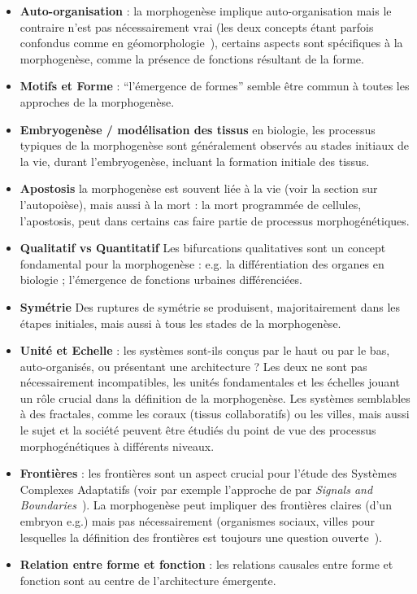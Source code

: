 {\begin{itemize}
\item \textbf{Auto-organisation} : la morphogenèse implique auto-organisation mais le contraire n'est pas nécessairement vrai (les deux concepts étant parfois confondus comme en géomorphologie~\cite{cholley1950morphologie}), certains aspects sont spécifiques à la morphogenèse, comme la présence de fonctions résultant de la forme.
\item \textbf{Motifs et Forme} : ``l'émergence de formes'' semble être commun à toutes les approches de la morphogenèse.
\item \textbf{Embryogenèse / modélisation des tissus} en biologie, les processus typiques de la morphogenèse sont généralement observés au stades initiaux de la vie, durant l'embryogenèse, incluant la formation initiale des tissus.
\item \textbf{Apostosis} la morphogenèse est souvent liée à la vie (voir la section sur l'autopoièse), mais aussi à la mort : la mort programmée de cellules, l'apostosis, peut dans certains cas faire partie de processus morphogénétiques.
\item \textbf{Qualitatif vs Quantitatif} Les bifurcations qualitatives sont un concept fondamental pour la morphogenèse : e.g. la différentiation des organes en biologie ; l'émergence de fonctions urbaines différenciées.
\item \textbf{Symétrie} Des ruptures de symétrie se produisent, majoritairement dans les étapes initiales, mais aussi à tous les stades de la morphogenèse.
\item \textbf{Unité et Echelle} : les systèmes sont-ils conçus par le haut ou par le bas, auto-organisés, ou présentant une architecture ? Les deux ne sont pas nécessairement incompatibles, les unités fondamentales et les échelles jouant un rôle crucial dans la définition de la morphogenèse. Les systèmes semblables à des fractales, comme les coraux (tissus collaboratifs) ou les villes, mais aussi le sujet et la société peuvent être étudiés du point de vue des processus morphogénétiques à différents niveaux.
\item \textbf{Frontières} : les frontières sont un aspect crucial pour l'étude des Systèmes Complexes Adaptatifs (voir par exemple l'approche de  par \emph{Signals and Boundaries}~\cite{holland2012signals}). La morphogenèse peut impliquer des frontières claires (d'un embryon e.g.) mais pas nécessairement (organismes sociaux, villes pour lesquelles la définition des frontières est toujours une question ouverte~\cite{2015arXiv150707878C}).
\item \textbf{Relation entre forme et fonction} : les relations causales entre forme et fonction sont au centre de l'architecture émergente.
\end{itemize}
}



